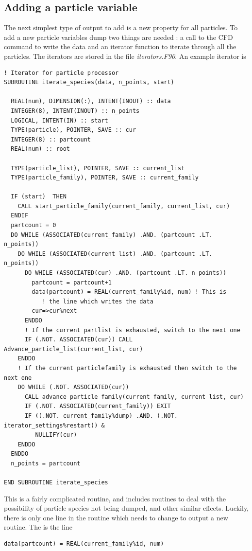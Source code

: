 \documentclass[12pt,a4paper]{article}
\newcommand{\simpleboxverbatim}{\begin{Verbatim}[obeytabs=true,frame=single,
  framerule=0.5mm,rulecolor=\color{warwickmid},formatcom=\color{black}]}
\begin{document}
\subsection{Adding a particle variable}
The next simplest type of output to add is a new property for all particles. To
add a new particle variables dump two things are needed : a call to the CFD
command to write the data and an iterator function to iterate through all the
particles. The iterators are stored in the file {\it iterators.F90}. An example
iterator is

\simpleboxverbatim
! Iterator for particle processor
SUBROUTINE iterate_species(data, n_points, start)

  REAL(num), DIMENSION(:), INTENT(INOUT) :: data
  INTEGER(8), INTENT(INOUT) :: n_points
  LOGICAL, INTENT(IN) :: start
  TYPE(particle), POINTER, SAVE :: cur
  INTEGER(8) :: partcount
  REAL(num) :: root

  TYPE(particle_list), POINTER, SAVE :: current_list
  TYPE(particle_family), POINTER, SAVE :: current_family

  IF (start)  THEN
    CALL start_particle_family(current_family, current_list, cur)
  ENDIF
  partcount = 0
  DO WHILE (ASSOCIATED(current_family) .AND. (partcount .LT. n_points))
    DO WHILE (ASSOCIATED(current_list) .AND. (partcount .LT. n_points))
      DO WHILE (ASSOCIATED(cur) .AND. (partcount .LT. n_points))
        partcount = partcount+1
        data(partcount) = REAL(current_family%id, num) ! This is
           ! the line which writes the data
        cur=>cur%next
      ENDDO
      ! If the current partlist is exhausted, switch to the next one
      IF (.NOT. ASSOCIATED(cur)) CALL Advance_particle_list(current_list, cur)
    ENDDO
    ! If the current particlefamily is exhausted then switch to the next one
    DO WHILE (.NOT. ASSOCIATED(cur))
      CALL advance_particle_family(current_family, current_list, cur)
      IF (.NOT. ASSOCIATED(current_family)) EXIT
      IF ((.NOT. current_family%dump) .AND. (.NOT. iterator_settings%restart)) &
         NULLIFY(cur)
    ENDDO
  ENDDO
  n_points = partcount

END SUBROUTINE iterate_species
\end{Verbatim}

This is a fairly complicated routine, and includes routines to deal with the
possibility of particle species not being dumped, and other similar
effects. Luckily, there is only one line in the routine which needs to change
to output a new routine. The is the line
\simpleboxverbatim
  data(partcount) = REAL(current_family%
\end{Verbatim}
\end{document}
